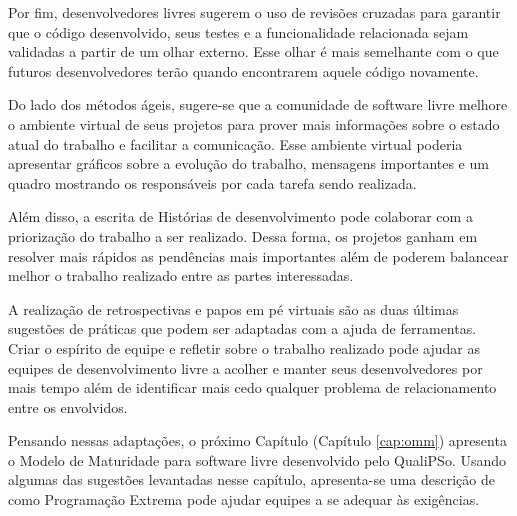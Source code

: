 Por fim, desenvolvedores livres sugerem o uso de revisões cruzadas
para garantir que o código desenvolvido, seus testes e a
funcionalidade relacionada sejam validadas a partir de um olhar
externo. Esse olhar é mais semelhante com o que futuros
desenvolvedores terão quando encontrarem aquele código novamente.

Do lado dos métodos ágeis, sugere-se que a comunidade de software
livre melhore o ambiente virtual de seus projetos para prover mais
informações sobre o estado atual do trabalho e facilitar a
comunicação. Esse ambiente virtual poderia apresentar gráficos sobre a
evolução do trabalho, mensagens importantes e um quadro mostrando os
responsáveis por cada tarefa sendo realizada.

Além disso, a escrita de Histórias de desenvolvimento pode colaborar
com a priorização do trabalho a ser realizado. Dessa forma, os
projetos ganham em resolver mais rápidos as pendências mais
importantes além de poderem balancear melhor o trabalho realizado
entre as partes interessadas.

A realização de retrospectivas e papos em pé virtuais são as duas
últimas sugestões de práticas que podem ser adaptadas com a ajuda de
ferramentas. Criar o espírito de equipe e refletir sobre o trabalho
realizado pode ajudar as equipes de desenvolvimento livre a acolher e
manter seus desenvolvedores por mais tempo além de identificar mais
cedo qualquer problema de relacionamento entre os envolvidos.

Pensando nessas adaptações, o próximo Capítulo (Capítulo
\ref{cap:omm}) apresenta o Modelo de Maturidade para software livre
desenvolvido pelo QualiPSo. Usando algumas das sugestões levantadas
nesse capítulo, apresenta-se uma descrição de como Programação Extrema
pode ajudar equipes a se adequar às exigências.

